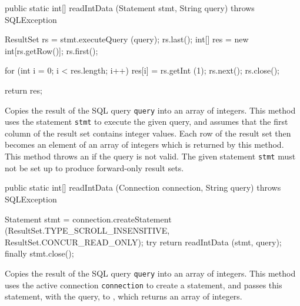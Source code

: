 \begin{code}

   public static int[] readIntData (Statement stmt, String query)
            throws SQLException\begin{hide} {
      ResultSet rs = stmt.executeQuery (query);
      rs.last();
      int[] res = new int[rs.getRow()];
      rs.first();
        
      for (int i = 0; i < res.length; i++)
      {
         res[i] = rs.getInt (1);
         rs.next();
      }
      rs.close();
            
      return res;
   }\end{hide}
\end{code}
\begin{tabb}
   Copies the result of the SQL query \texttt{query} into an array of integers.
   This method uses the statement \texttt{stmt} to execute the given query, and
   assumes that the first column of the result set contains integer values.
   Each row of the result set then becomes an element of an array of integers
    which is returned by this method.
    This method throws an  if the query is not valid.
   The given statement \texttt{stmt} must not be set up to
   produce forward-only result sets.
\end{tabb}
\begin{htmlonly}
\end{htmlonly}
\begin{code}

   public static int[] readIntData (Connection connection, String query)
            throws SQLException\begin{hide} {
      Statement stmt = connection.createStatement
      (ResultSet.TYPE_SCROLL_INSENSITIVE, ResultSet.CONCUR_READ_ONLY);
      try {
         return readIntData (stmt, query);
      }
      finally {
         stmt.close();
      }
   }\end{hide}
\end{code}
\begin{tabb}
   Copies the result of the SQL query \texttt{query} into an array of integers.
   This method uses the active connection \texttt{connection} to create
   a statement, and passes this statement, with the query, to
   , which returns an
   array of integers.
\end{tabb}
